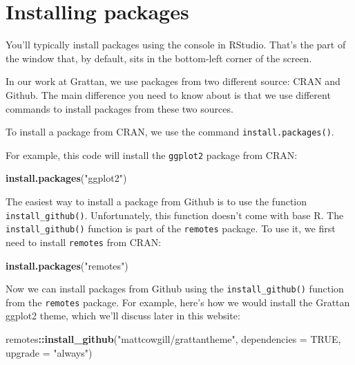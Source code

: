 \documentclass[]{book}
\newenvironment{Shaded}{\begin{snugshade}}{\end{snugshade}}
\newcommand{\DataTypeTok}[1]{\textcolor[rgb]{0.13,0.29,0.53}{#1}}
\newcommand{\KeywordTok}[1]{\textcolor[rgb]{0.13,0.29,0.53}{\textbf{#1}}}
\newcommand{\NormalTok}[1]{#1}
\newcommand{\OperatorTok}[1]{\textcolor[rgb]{0.81,0.36,0.00}{\textbf{#1}}}
\newcommand{\OtherTok}[1]{\textcolor[rgb]{0.56,0.35,0.01}{#1}}
\newcommand{\StringTok}[1]{\textcolor[rgb]{0.31,0.60,0.02}{#1}}
\begin{document}
\hypertarget{install-packages}{%
\section{Installing packages}\label{install-packages}}

You'll typically install packages using the console in RStudio. That's the part of the window that, by default, sits in the bottom-left corner of the screen.

In our work at Grattan, we use packages from two different source: CRAN and Github. The main difference you need to know about is that we use different commands to install packages from these two sources.

To install a package from CRAN, we use the command \texttt{install.packages()}.

For example, this code will install the \texttt{ggplot2} package from CRAN:

\begin{Shaded}
\begin{Highlighting}[]
\KeywordTok{install.packages}\NormalTok{(}\StringTok{"ggplot2"}\NormalTok{)}
\end{Highlighting}
\end{Shaded}

The easiest way to install a package from Github is to use the function \texttt{install\_github()}. Unfortunately, this function doesn't come with base R. The \texttt{install\_github()} function is part of the \texttt{remotes} package. To use it, we first need to install \texttt{remotes} from CRAN:

\begin{Shaded}
\begin{Highlighting}[]
\KeywordTok{install.packages}\NormalTok{(}\StringTok{"remotes"}\NormalTok{)}
\end{Highlighting}
\end{Shaded}

Now we can install packages from Github using the \texttt{install\_github()} function from the \texttt{remotes} package. For example, here's how we would install the Grattan ggplot2 theme, which we'll discuss later in this website:

\begin{Shaded}
\begin{Highlighting}[]
\NormalTok{remotes}\OperatorTok{::}\KeywordTok{install_github}\NormalTok{(}\StringTok{"mattcowgill/grattantheme"}\NormalTok{, }\DataTypeTok{dependencies =} \OtherTok{TRUE}\NormalTok{, }\DataTypeTok{upgrade =} \StringTok{"always"}\NormalTok{)}
\end{Highlighting}
\end{Shaded}
\end{document}
